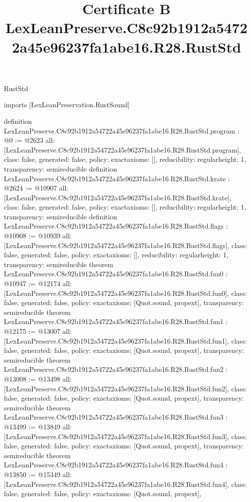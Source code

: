 \begin{lexlean}{RustStd}
\title{Certificate B LexLeanPreserve.C8c92b1912a54722a45e96237fa1abe16.R28.RustStd}
\begin{coremodule}
imports [LexLeanPreservation.RustSound]

definition LexLeanPreserve.C8c92b1912a54722a45e96237fa1abe16.R28.RustStd.program : @0 := @2623 {
  all: [LexLeanPreserve.C8c92b1912a54722a45e96237fa1abe16.R28.RustStd.program],
  class: false,
  generated: false,
  policy: exact{axioms: []},
  reducibility: regular{height: 1},
  transparency: semireducible
}
definition LexLeanPreserve.C8c92b1912a54722a45e96237fa1abe16.R28.RustStd.krate : @2624 := @10907 {
  all: [LexLeanPreserve.C8c92b1912a54722a45e96237fa1abe16.R28.RustStd.krate],
  class: false,
  generated: false,
  policy: exact{axioms: []},
  reducibility: regular{height: 1},
  transparency: semireducible
}
definition LexLeanPreserve.C8c92b1912a54722a45e96237fa1abe16.R28.RustStd.flags : @10908 := @10939 {
  all: [LexLeanPreserve.C8c92b1912a54722a45e96237fa1abe16.R28.RustStd.flags],
  class: false,
  generated: false,
  policy: exact{axioms: []},
  reducibility: regular{height: 1},
  transparency: semireducible
}
theorem LexLeanPreserve.C8c92b1912a54722a45e96237fa1abe16.R28.RustStd.fun0 : @10947 := @12174 {
  all: [LexLeanPreserve.C8c92b1912a54722a45e96237fa1abe16.R28.RustStd.fun0],
  class: false,
  generated: false,
  policy: exact{axioms: [Quot.sound, propext]},
  transparency: semireducible
}
theorem LexLeanPreserve.C8c92b1912a54722a45e96237fa1abe16.R28.RustStd.fun1 : @12175 := @13007 {
  all: [LexLeanPreserve.C8c92b1912a54722a45e96237fa1abe16.R28.RustStd.fun1],
  class: false,
  generated: false,
  policy: exact{axioms: [Quot.sound, propext]},
  transparency: semireducible
}
theorem LexLeanPreserve.C8c92b1912a54722a45e96237fa1abe16.R28.RustStd.fun2 : @13008 := @13498 {
  all: [LexLeanPreserve.C8c92b1912a54722a45e96237fa1abe16.R28.RustStd.fun2],
  class: false,
  generated: false,
  policy: exact{axioms: [Quot.sound, propext]},
  transparency: semireducible
}
theorem LexLeanPreserve.C8c92b1912a54722a45e96237fa1abe16.R28.RustStd.fun3 : @13499 := @13849 {
  all: [LexLeanPreserve.C8c92b1912a54722a45e96237fa1abe16.R28.RustStd.fun3],
  class: false,
  generated: false,
  policy: exact{axioms: [Quot.sound, propext]},
  transparency: semireducible
}
theorem LexLeanPreserve.C8c92b1912a54722a45e96237fa1abe16.R28.RustStd.fun4 : @13850 := @15349 {
  all: [LexLeanPreserve.C8c92b1912a54722a45e96237fa1abe16.R28.RustStd.fun4],
  class: false,
  generated: false,
  policy: exact{axioms: [Quot.sound, propext]},
}
\end{coremodule}
\end{lexlean}
